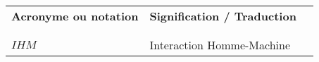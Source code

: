 


\begin{table}[htbp]
\centering
\begin{tabular}{l l l}

\textbf{Acronyme ou notation} & \textbf{Signification / Traduction} & \\ \\ %
\hline
\\

$IHM$ & Interaction Homme-Machine & \\

\end{tabular}
\end{table}

